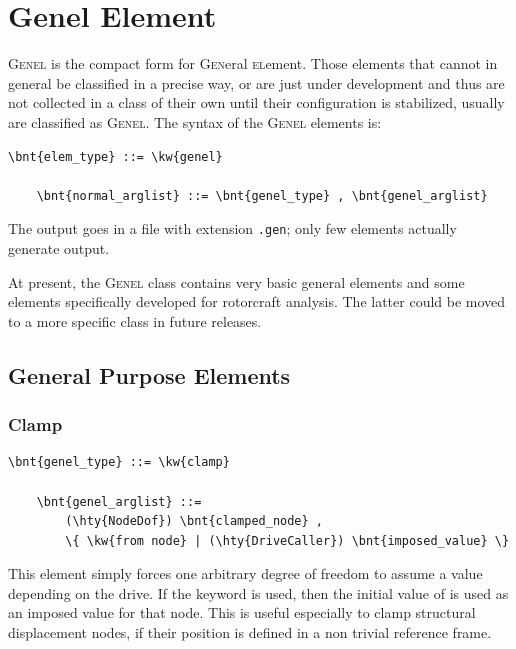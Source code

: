 \section{Genel Element}
\label{sec:EL:GENEL}
\textsc{Genel} is the compact form for \textsc{Gen}eral \textsc{el}ement.
Those elements that cannot in general be classified in a precise way, 
or are just under development and thus are not collected in a class 
of their own until their configuration is stabilized, usually are
classified as \textsc{Genel}.
The syntax of the \textsc{Genel} elements is:
\begin{Verbatim}[commandchars=\\\{\}]
    \bnt{elem_type} ::= \kw{genel}

    \bnt{normal_arglist} ::= \bnt{genel_type} , \bnt{genel_arglist}
\end{Verbatim}

\noindent
The output goes in a file with extension \texttt{.gen}; only few elements
actually generate output.

\noindent
At present, the \textsc{Genel} class contains very basic general elements
and some elements specifically developed for rotorcraft analysis.
The latter could be moved to a more specific class in future releases.

\subsection{General Purpose Elements}
   
\subsubsection{Clamp}
\label{sec:EL:GENEL:CLAMP}
\begin{Verbatim}[commandchars=\\\{\}]
    \bnt{genel_type} ::= \kw{clamp}

    \bnt{genel_arglist} ::=
        (\hty{NodeDof}) \bnt{clamped_node} ,
        \{ \kw{from node} | (\hty{DriveCaller}) \bnt{imposed_value} \}
\end{Verbatim}
This element simply forces one arbitrary degree of freedom to assume a value
depending on the drive. If the keyword  is used, then the
initial value of  is used as an imposed value for that node.
This is useful especially to clamp structural displacement nodes, if their position
is defined in a non trivial reference frame.

